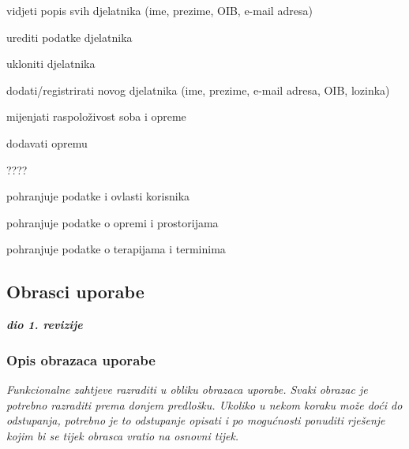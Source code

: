 \begin{packed_enum}
\begin{packed_enum}
				\end{packed_enum}
				\item  {}
				\begin{packed_enum}
					
					\item vidjeti popis svih djelatnika (ime, prezime, OIB, e-mail adresa)
					\item urediti podatke djelatnika
					\item ukloniti djelatnika
					\item dodati/registrirati novog djelatnika (ime, prezime, e-mail adresa, OIB, lozinka)
					\item mijenjati raspoloživost soba i opreme
					\item dodavati opremu
					\item ????
					
				\end{packed_enum}
				
				\item  {}
				\begin{packed_enum}
					
					\item pohranjuje podatke i ovlasti korisnika
					\item pohranjuje podatke o opremi i prostorijama
					\item pohranjuje podatke o terapijama i terminima
					
				\end{packed_enum}
			\end{packed_enum}
			
			\eject 
			
			
				
			\subsection{Obrasci uporabe}
				
				\textbf{\textit{dio 1. revizije}}
				
				\subsubsection{Opis obrazaca uporabe}
					\textit{Funkcionalne zahtjeve razraditi u obliku obrazaca uporabe. Svaki obrazac je potrebno razraditi prema donjem predlošku. Ukoliko u nekom koraku može doći do odstupanja, potrebno je to odstupanje opisati i po mogućnosti ponuditi rješenje kojim bi se tijek obrasca vratio na osnovni tijek.}\\
					

